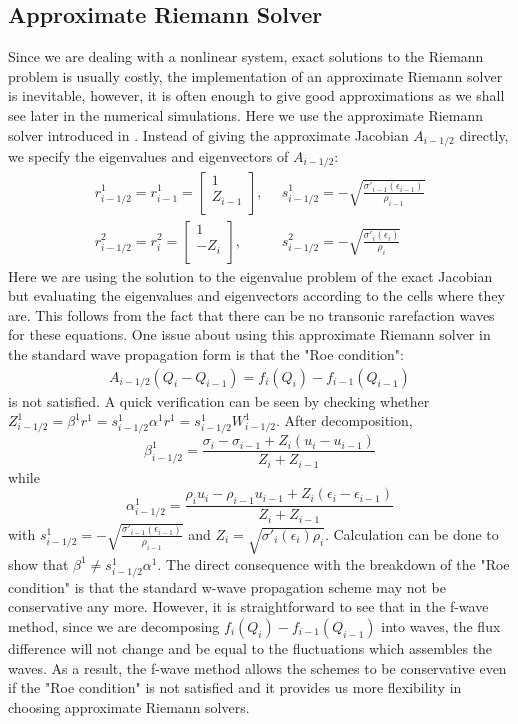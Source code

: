 \documentclass{article}
\begin{document}
\subsection{Approximate Riemann Solver}
Since we are dealing with a nonlinear system, exact solutions to the Riemann problem is usually costly, the implementation of an approximate Riemann solver is inevitable, however, it is often enough to give good approximations as we shall see later in the numerical simulations. Here we use the approximate Riemann solver introduced in \cite{leveque2003}. Instead of giving the approximate Jacobian $A_{i-1/2}$ directly, we specify the eigenvalues and eigenvectors of $A_{i-1/2}$:
\begin{align}
r^1_{i-1/2}=r^1_{i-1}=\left[
                        \begin{array}{c}
                          1 \\ Z_{i-1} \\
                        \end{array}
                      \right], & \,\,\, s^1_{i-1/2}=-\sqrt{\frac{\sigma'_{i-1}(\epsilon_{i-1})}{\rho_{i-1}}}\\
r^2_{i-1/2}=r^2_{i}=\left[
                        \begin{array}{c}
                          1 \\ -Z_{i} \\
                        \end{array}
                      \right], &\,\,\, s^2_{i-1/2}=-\sqrt{\frac{\sigma'_{i}(\epsilon_{i})}{\rho_{i}}}                  
\end{align}
Here we are using the solution to the eigenvalue problem of the exact Jacobian but evaluating the eigenvalues and eigenvectors according to the cells where they are. This follows from the fact that there can be no transonic rarefaction waves for these equations. One issue about using this approximate Riemann solver in the standard wave propagation form is that the "Roe condition":
\begin{align}
A_{i-1/2}(Q_i-Q_{i-1})=f_{i}(Q_i)-f_{i-1}(Q_{i-1})
\end{align}
is not satisfied.
A quick verification can be seen by checking whether $Z^1_{i-1/2}=\beta^1 r^1=s^1_{i-1/2} \alpha^1r^1=s^1_{i-1/2}W^1_{i-1/2}$. After decomposition,
\[
\beta^1_{i-1/2}=\frac{\sigma_i-\sigma_{i-1}+Z_i(u_i-u_{i-1})}{Z_i+Z_{i-1}}
\]
while
\[
\alpha^1_{i-1/2}=\frac{\rho_i u_i-\rho_{i-1}u_{i-1}+Z_i(\epsilon_i-\epsilon_{i-1})}{Z_i+Z_{i-1}}
\]
with $s^1_{i-1/2}=-\sqrt{\frac{\sigma'_{i-1}(\epsilon_{i-1})}{\rho_{i-1}}}$
and $Z_i=\sqrt{\sigma'_{i}(\epsilon_{i})\rho_{i}}$. Calculation can be done to show that $ \beta^1 \neq s^1_{i-1/2} \alpha^1$. The direct consequence with the breakdown of the "Roe condition" is that the standard w-wave propagation scheme may not be conservative any more. However, it is straightforward to see that in the f-wave method, since we are decomposing $f_{i}(Q_i)-f_{i-1}(Q_{i-1})$ into waves, the flux difference will not change and be equal to the fluctuations which assembles the waves. As a result, the f-wave method allows the schemes to be conservative even if the "Roe condition" is not satisfied and it provides us more flexibility in choosing approximate Riemann solvers.
\end{document}
